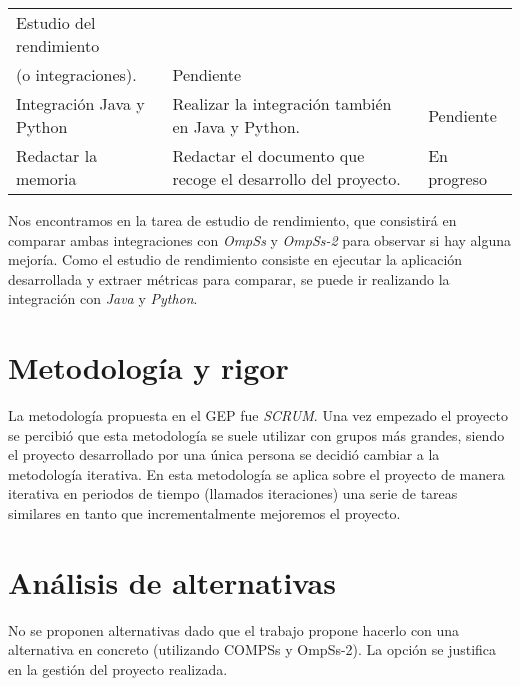 \begin{longtable}{|l|l|l|}
Estudio del rendimiento                                                         & \begin{tabular}[c]{@{}l@{}}Estudio final del rendimiento de la integración\\ (o integraciones).\end{tabular}                                                                          & Pendiente   \\ \hline
Integración Java y Python                                                       & Realizar la integración también en Java y Python.                                                                                                                                     & Pendiente   \\ \hline
Redactar la memoria                                                             & Redactar el documento que recoge el desarrollo del proyecto.                                                                                                                          & En progreso \\ \hline
\end{longtable}

Nos encontramos en la tarea de estudio de rendimiento, que consistirá en comparar ambas integraciones con \textit{OmpSs} y \textit{OmpSs-2} para observar si hay alguna mejoría. 
\smallskip
Como el estudio de rendimiento consiste en ejecutar la aplicación desarrollada y extraer métricas para comparar, se puede ir realizando la integración con \textit{Java} y \textit{Python}.

\section{Metodología y rigor}

La metodología propuesta en el GEP fue \textit{SCRUM}. Una vez empezado el proyecto se percibió que esta metodología se suele utilizar con grupos más grandes, siendo el proyecto desarrollado por una única persona se decidió cambiar a la metodología iterativa. En esta metodología se aplica sobre el proyecto de manera iterativa en periodos de tiempo (llamados iteraciones) una serie de tareas similares en tanto que incrementalmente mejoremos el proyecto.

\section{Análisis de alternativas}

No se proponen alternativas dado que el trabajo propone hacerlo con una alternativa en concreto (utilizando COMPSs y OmpSs-2). La opción se justifica en la gestión del proyecto realizada.

